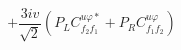 %
\begin{dmath*}
%
  +  \frac{3 i v}{\sqrt{2}} \left(P_L C^{u \varphi  *}_{f_2 f_1} + P_R C^{u \varphi  }_{f_1 f_2}\right)
%
\end{dmath*}
%
